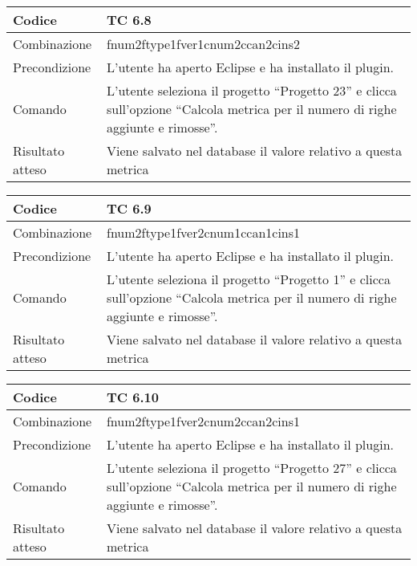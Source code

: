 \begin{table}[ht]
\begin{tabular}{|p{3cm}|p{9cm}|}
\hline
\cellcolor{lightgray}Codice				& TC 6.8								\\
\hline
\cellcolor{lightgray}Combinazione		& fnum2ftype1fver1cnum2ccan2cins2 									\\
\hline
\cellcolor{lightgray}Precondizione		& L'utente ha aperto Eclipse e ha installato il plugin.				\\
\hline
\cellcolor{lightgray}Comando			& L'utente seleziona il progetto ``Progetto 23''  e clicca sull'opzione ``Calcola metrica per il numero di righe aggiunte e rimosse''.	\\
\hline
\cellcolor{lightgray}Risultato atteso	& Viene salvato nel database il valore relativo a questa metrica	\\
\hline
\end{tabular}
\end{table}

\begin{table}[ht]
\begin{tabular}{|p{3cm}|p{9cm}|}
\hline
\cellcolor{lightgray}Codice				& TC 6.9								\\
\hline
\cellcolor{lightgray}Combinazione		& fnum2ftype1fver2cnum1ccan1cins1 									\\
\hline
\cellcolor{lightgray}Precondizione		& L'utente ha aperto Eclipse e ha installato il plugin.								\\
\hline
\cellcolor{lightgray}Comando			& L'utente seleziona il progetto ``Progetto 1''  e clicca sull'opzione ``Calcola metrica per il numero di righe aggiunte e rimosse''.	\\
\hline
\cellcolor{lightgray}Risultato atteso	& Viene salvato nel database il valore relativo a questa metrica	\\
\hline
\end{tabular}
\end{table}

\begin{table}[ht]
\begin{tabular}{|p{3cm}|p{9cm}|}
\hline
\cellcolor{lightgray}Codice				& TC 6.10								\\
\hline
\cellcolor{lightgray}Combinazione		& fnum2ftype1fver2cnum2ccan2cins1 									\\
\hline
\cellcolor{lightgray}Precondizione		& L'utente ha aperto Eclipse e ha installato il plugin.									\\
\hline
\cellcolor{lightgray}Comando			& L'utente seleziona il progetto ``Progetto 27''  e clicca sull'opzione ``Calcola metrica per il numero di righe aggiunte e rimosse''.	\\
\hline
\cellcolor{lightgray}Risultato atteso	& Viene salvato nel database il valore relativo a questa metrica	\\
\hline
\end{tabular}
\end{table}

